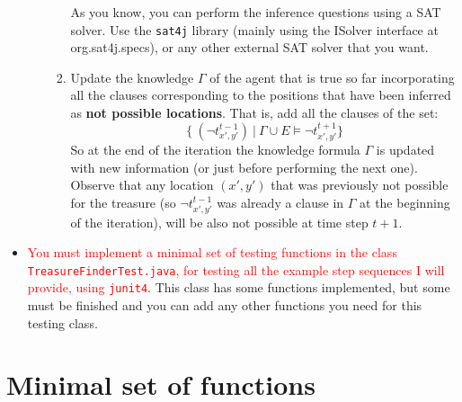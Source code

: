 \documentclass{tufte-handout}
\begin{document}
\begin{fullwidth}
\begin{itemize}
\begin{enumerate}
\begin{enumerate}
As you know, you can perform the inference questions using a
 SAT solver. Use the {\tt sat4j} library (mainly using the ISolver interface at org.sat4j.specs), or any other external SAT solver that you want.
\item Update the knowledge $\Gamma$ of the agent that
is true so far  incorporating
all the clauses corresponding to the positions that have been
 inferred as {\bf not possible locations}. That is, add all the
clauses of the set:
$$
 \{ \ (\neg t_{x',y'}^{t-1}) \ | \ \Gamma \cup E
    \models \neg  t_{x',y'}^{t+1} \} $$
So at the end of the iteration the knowledge formula $\Gamma$ is
updated with new information (or just before performing the next one).
Observe that any location $(x',y')$ that was previously not possible for the treasure
(so $ \neg t_{x',y'}^{t-1} $ was already a clause in $\Gamma$ at the beginning of
the iteration), will be also not possible at time step $t+1$.
\end{enumerate}
\end{enumerate}
\item  \textcolor{red}{You must implement a minimal set of testing functions in the class
{\tt TreasureFinderTest.java}, for testing all the example step sequences I will provide,
 using {\tt junit4}}. This class has some functions
implemented, but some must be finished and you can add any other functions you need for this
testing class.
\end{itemize}
\end{fullwidth}

\section{Minimal set of functions}
\end{document}

